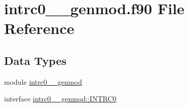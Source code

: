 \hypertarget{intrc0____genmod_8f90}{\section{intrc0\+\_\+\+\_\+genmod.\+f90 File Reference}
\label{intrc0____genmod_8f90}
}
\subsection*{Data Types}
\begin{DoxyCompactItemize}
\item 
module \hyperlink{classintrc0____genmod}{intrc0\+\_\+\+\_\+genmod}
\item 
interface \hyperlink{interfaceintrc0____genmod_1_1INTRC0}{intrc0\+\_\+\+\_\+genmod\+::\+I\+N\+T\+R\+C0}
\end{DoxyCompactItemize}

